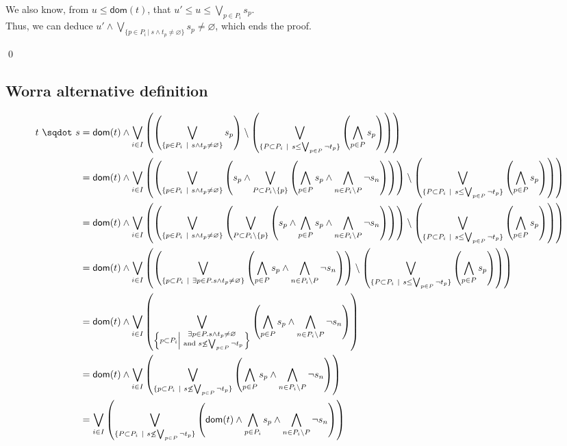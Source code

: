 \documentclass[a4paper]{article}%
\newcommand{\worra}[2]{#1\mathop{\,\sqdot\,} #2}
\newcommand{\dom}[1]{\textsf{dom}(#1)}
\newcommand{\alt}{~|~}
\begin{document}
    We also know, from $u \leq \dom t$, that $u' \leq u \leq \bigvee_{p\in P_i}s_p$.\\
    Thus, we can deduce $u' \land \bigvee_{\{p\in P_i\alt s\wedge t_p\not=\varnothing\}}s_p \neq \varnothing$, which ends the proof.
    
    \qed
    \pagebreak

    \subsection{Worra alternative definition}

    \begin{align*}
        \worra t s & = \dom t \wedge\bigvee_{i\in I}\left(\left(\bigvee_{\{p\in P_i\alt s\wedge t_p\not=\varnothing\}}s_p\right)
            \setminus \left(\bigvee_{\{P \subset P_i\alt s \leq \bigvee_{p \in P} \neg t_p\}} \left(\bigwedge_{p \in P} s_p\right) \right)\right)\\
        & = \dom t \wedge\bigvee_{i\in I}\left(\left(\bigvee_{\{p\in P_i\alt s\wedge t_p\not=\varnothing\}}\left(
            s_p \land \bigvee_{P \subset P_i \setminus \{p\}} \left(\bigwedge_{p \in P} s_p \land \bigwedge_{n \in P_i \setminus P} \neg s_n \right)\right)\right)
            \setminus \left(\bigvee_{\{P \subset P_i\alt s \leq \bigvee_{p \in P} \neg t_p\}} \left(\bigwedge_{p \in P} s_p\right) \right)\right)\\
        & = \dom t \wedge\bigvee_{i\in I}\left(\left(\bigvee_{\{p\in P_i\alt s\wedge t_p\not=\varnothing\}}\left(
            \bigvee_{P \subset P_i \setminus \{p\}} \left(s_p \land \bigwedge_{p \in P} s_p \land \bigwedge_{n \in P_i \setminus P} \neg s_n \right)\right)\right)
            \setminus \left(\bigvee_{\{P \subset P_i\alt s \leq \bigvee_{p \in P} \neg t_p\}} \left(\bigwedge_{p \in P} s_p\right) \right)\right)\\    
        & = \dom t \wedge\bigvee_{i\in I}\left(\left(\bigvee_{\{p\subset P_i\alt \exists p \in P. s\wedge t_p\not=\varnothing\}}\left(
            \bigwedge_{p \in P} s_p \land \bigwedge_{n \in P_i \setminus P} \neg s_n \right)\right)
            \setminus \left(\bigvee_{\{P \subset P_i\alt s \leq \bigvee_{p \in P} \neg t_p\}} \left(\bigwedge_{p \in P} s_p\right) \right)\right)\\        
        & = \dom t \wedge\bigvee_{i\in I}\left(\bigvee_{\left\{p\subset P_i\left|
            \substack{\exists p \in P. s\wedge t_p\not=\varnothing\\
            \text{ and } s \not\leq \bigvee_{p \in P} \neg t_p}
            \right.\right\}}\left(
            \bigwedge_{p \in P} s_p \land \bigwedge_{n \in P_i \setminus P} \neg s_n \right)\right)\\
        & = \dom t \wedge\bigvee_{i\in I}\left(\bigvee_{\{p\subset P_i\alt s \not\leq \bigvee_{p \in P} \neg t_p \}}\left(
            \bigwedge_{p \in P} s_p \land \bigwedge_{n \in P_i \setminus P} \neg s_n \right)\right)\\
        & = \bigvee_{i \in I} \left( \bigvee_{\{P \subset P_i\alt s \not\leq \bigvee_{p \in P} \neg t_p \} }\left(
            \dom t \land \bigwedge_{p\in P_i} s_p \land \bigwedge_{n \in P_i \setminus P} \neg s_n \right)\right)
    \end{align*}
    \pagebreak
\end{document}

